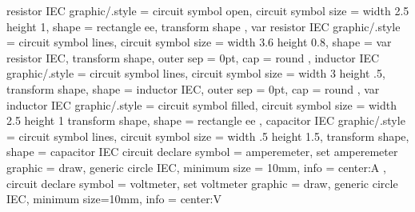 %
%
\tikzset
{
  resistor IEC graphic/.style =
  {
    circuit symbol open,
    circuit symbol size = width 2.5 height 1,
    shape = rectangle ee,
    transform shape
  },
  var resistor IEC graphic/.style =
  {
    circuit symbol lines,
    circuit symbol size = width 3.6 height 0.8,
    shape = var resistor IEC,
    transform shape,
    outer sep = 0pt,
    cap = round
  },
  inductor IEC graphic/.style =
  {
    circuit symbol lines,
    circuit symbol size = width 3 height .5,
    transform shape,
    shape = inductor IEC,
    outer sep = 0pt,
    cap = round
  },
  var inductor IEC graphic/.style =
  {
    circuit symbol filled,
    circuit symbol size = width 2.5 height 1
    transform shape,
    shape = rectangle ee
  },
  capacitor IEC graphic/.style =
  {
    circuit symbol lines,
    circuit symbol size = width .5 height 1.5,
    transform shape,
    shape = capacitor IEC
  }
}
%
%
\tikzset
{
  circuit declare symbol = amperemeter,
  set amperemeter graphic =
  {
    draw,
    generic circle IEC,
    minimum size = 10mm,
    info = center:A
  },
  circuit declare symbol = voltmeter,
  set voltmeter graphic =
  {
    draw,
    generic circle IEC,
    minimum size=10mm,
    info = center:V
  }
}
%
%

